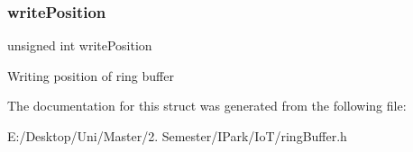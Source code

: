 \subsubsection{\texorpdfstring{write\+Position}{writePosition}}
{\footnotesize\ttfamily unsigned int write\+Position}

Writing position of ring buffer 

The documentation for this struct was generated from the following file\+:\begin{DoxyCompactItemize}
\item 
E\+:/\+Desktop/\+Uni/\+Master/2. Semester/\+I\+Park/\+Io\+T/ring\+Buffer.\+h\end{DoxyCompactItemize}
